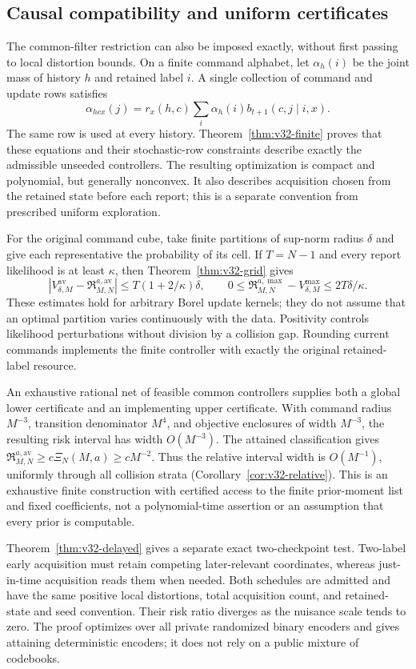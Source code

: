 \subsection{Causal compatibility and uniform certificates}
The common-filter restriction can also be imposed exactly, without first
passing to local distortion bounds. On a finite command alphabet, let
$\alpha_h(i)$ be the joint mass of history $h$ and retained label $i$.
A single collection of command and update rows satisfies
\[
 \alpha_{hcx}(j)=r_x(h,c)\sum_i\alpha_h(i)b_{t+1}(c,j\mid i,x).
\]
The same row is used at every history. Theorem~\ref{thm:v32-finite}
proves that these equations and their stochastic-row constraints describe
exactly the admissible unseeded controllers. The resulting optimization
is compact and polynomial, but generally nonconvex. It also describes
acquisition chosen from the retained state before each report; this is a
separate convention from prescribed uniform exploration.

For the original command cube, take finite partitions of sup-norm radius
$\delta$ and give each representative the probability of its cell. If
$T=N-1$ and every report likelihood is at least $\kappa$, then
Theorem~\ref{thm:v32-grid} gives
\[
 |V^{\mathrm{av}}_{\delta,M}-\mathfrak R_{M,N}^{a,\mathrm{av}}|
       \le T(1+2/\kappa)\delta,
 \qquad
 0\le\mathfrak R_{M,N}^{a,\max}-V^{\max}_{\delta,M}
       \le2T\delta/\kappa.
\]
These estimates hold for arbitrary Borel update kernels; they do not
assume that an optimal partition varies continuously with the data.
Positivity controls likelihood perturbations without division by a
collision gap. Rounding current commands implements the finite controller
with exactly the original retained-label resource.

An exhaustive rational net of feasible common controllers supplies both
a global lower certificate and an implementing upper certificate. With
command radius $M^{-3}$, transition denominator $M^4$, and objective
enclosures of width $M^{-3}$, the resulting risk interval has width
$O(M^{-3})$. The attained classification gives
$\mathfrak R_{M,N}^{a,\mathrm{av}}\ge c\Xi_N(M,a)\ge cM^{-2}$.
Thus the relative interval width is $O(M^{-1})$, uniformly through all
collision strata (Corollary~\ref{cor:v32-relative}). This is an exhaustive
finite construction with certified access to the finite prior-moment
list and fixed coefficients, not a polynomial-time assertion or an assumption that every prior
is computable.

Theorem~\ref{thm:v32-delayed} gives a separate exact two-checkpoint test.
Two-label early acquisition must retain competing later-relevant
coordinates, whereas just-in-time acquisition reads them when needed.
Both schedules are admitted and have the same positive local distortions,
total acquisition count, and retained-state and seed convention. Their
risk ratio diverges as the nuisance scale tends to zero. The proof
optimizes over all private randomized binary encoders and gives attaining
deterministic encoders; it does not rely on a public mixture of codebooks.

